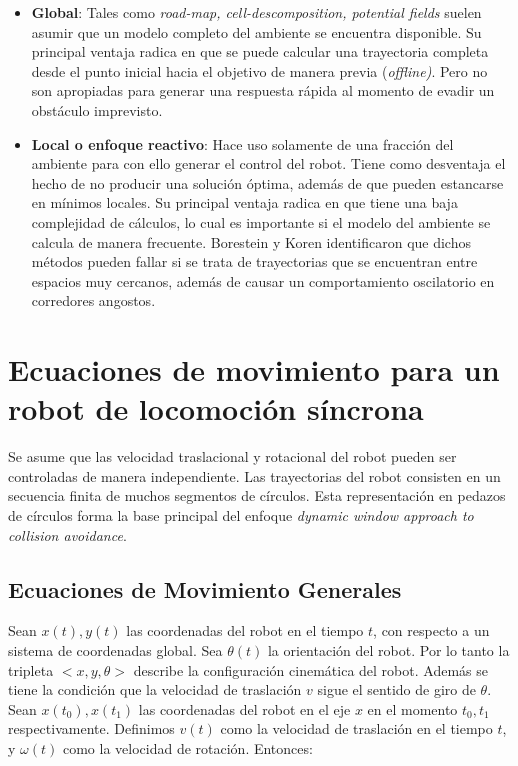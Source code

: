 \documentclass[12pt]{article}
\begin{document}
\begin{itemize}

	\item \textbf{Global}: Tales como \emph{road-map, cell-descomposition, potential fields} suelen asumir que un modelo completo del ambiente se encuentra disponible. Su principal ventaja radica en que se puede calcular una trayectoria completa desde el punto inicial hacia el objetivo de manera previa (\emph{offline)}. Pero no son apropiadas para generar una respuesta rápida al momento de evadir un obstáculo imprevisto.
	
	\item \textbf{Local o enfoque reactivo}: Hace uso solamente de una fracción del ambiente para con ello generar el control del robot. Tiene como desventaja el hecho de no producir una solución óptima, además de que pueden estancarse en mínimos locales. Su principal ventaja radica en que tiene una baja complejidad de cálculos, lo cual es importante si el modelo del ambiente se calcula de manera frecuente. Borestein y Koren identificaron que dichos métodos pueden fallar si se trata de trayectorias que se encuentran entre espacios muy cercanos, además de causar un comportamiento oscilatorio en corredores angostos.
		
\end{itemize}

\section{Ecuaciones de movimiento para un robot de locomoción síncrona}

Se asume que las velocidad traslacional y rotacional del robot pueden ser controladas de manera independiente. Las trayectorias del robot consisten en un secuencia finita de muchos segmentos de círculos. Esta representación en pedazos de círculos forma la base principal del enfoque \emph{dynamic window approach to collision avoidance}.

\subsection{Ecuaciones de Movimiento Generales}

Sean $x(t), y(t)$ las coordenadas del robot en el tiempo $t$, con respecto a un sistema de coordenadas global. Sea $\theta(t)$ la orientación del robot. Por lo tanto la tripleta $<x, y, \theta>$ describe la configuración cinemática del robot. Además se tiene la condición que la velocidad de traslación $v$ sigue el sentido de giro de $\theta$. Sean $x(t_0), x(t_1)$ las coordenadas del robot en el eje $x$ en el momento $t_0, t_1$ respectivamente. Definimos $v(t)$ como la velocidad de traslación en el tiempo $t$, y $\omega(t)$ como la velocidad de rotación. Entonces:
\end{document}
